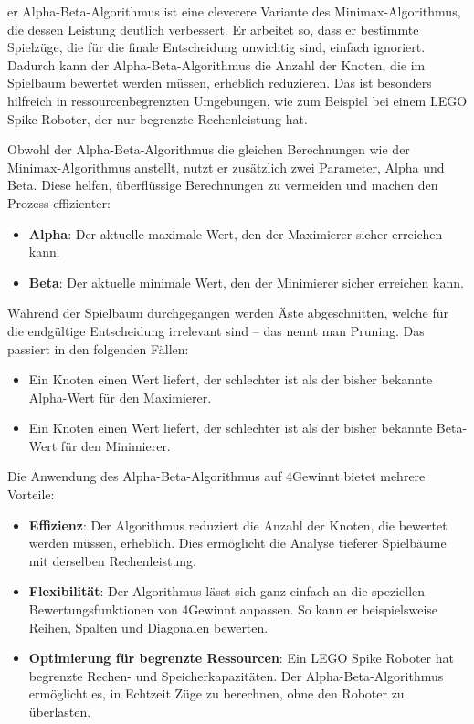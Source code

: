 er Alpha-Beta-Algorithmus ist eine cleverere Variante des Minimax-Algorithmus, die dessen Leistung deutlich verbessert. Er arbeitet so, dass er bestimmte Spielzüge, die für die finale Entscheidung unwichtig sind, einfach ignoriert. Dadurch kann der Alpha-Beta-Algorithmus die Anzahl der Knoten, die im Spielbaum bewertet werden müssen, erheblich reduzieren. Das ist besonders hilfreich in ressourcenbegrenzten Umgebungen, wie zum Beispiel bei einem LEGO Spike Roboter, der nur begrenzte Rechenleistung hat.

Obwohl der Alpha-Beta-Algorithmus die gleichen Berechnungen wie der Minimax-Algorithmus anstellt, nutzt er zusätzlich zwei Parameter, Alpha und Beta. Diese helfen, überflüssige Berechnungen zu vermeiden und machen den Prozess effizienter:

\begin{itemize}
	\item \textbf{Alpha}: Der aktuelle maximale Wert, den der Maximierer sicher erreichen kann.
	\item \textbf{Beta}: Der aktuelle minimale Wert, den der Minimierer sicher erreichen kann.
\end{itemize}

Während der Spielbaum durchgegangen werden Äste abgeschnitten, welche für die endgültige Entscheidung irrelevant sind – das nennt man Pruning. Das passiert in den folgenden Fällen:
\begin{itemize}
	\item Ein Knoten einen Wert liefert, der schlechter ist als der bisher bekannte Alpha-Wert für den Maximierer.
	\item Ein Knoten einen Wert liefert, der schlechter ist als der bisher bekannte Beta-Wert für den Minimierer.
\end{itemize}

Die Anwendung des Alpha-Beta-Algorithmus auf 4Gewinnt bietet mehrere Vorteile:
\begin{itemize}
	\item \textbf{Effizienz}: Der Algorithmus reduziert die Anzahl der Knoten, die bewertet werden müssen, erheblich. Dies ermöglicht die Analyse tieferer Spielbäume mit derselben Rechenleistung.
	\item \textbf{Flexibilität}: Der Algorithmus lässt sich ganz einfach an die speziellen Bewertungsfunktionen von 4Gewinnt anpassen. So kann er beispielsweise Reihen, Spalten und Diagonalen bewerten.
	\item \textbf{Optimierung für begrenzte Ressourcen}: Ein LEGO Spike Roboter hat begrenzte Rechen- und Speicherkapazitäten. Der Alpha-Beta-Algorithmus ermöglicht es, in Echtzeit Züge zu berechnen, ohne den Roboter zu überlasten.
\end{itemize}

